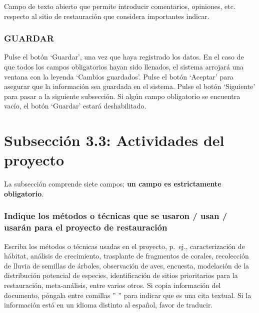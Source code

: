 \documentclass[
]{book}
\begin{document}
Campo de texto abierto que permite introducir comentarios, opiniones, etc. respecto al sitio de restauración que considera importantes indicar.

\hypertarget{guardar-4}{%
\subsection{GUARDAR}\label{guardar-4}}

Pulse el botón `Guardar', una vez que haya registrado los datos.
En el caso de que todos los campos obligatorios hayan sido llenados, el sistema arrojará una ventana con la leyenda `Cambios guardados'. Pulse el botón `Aceptar' para asegurar que la información sea guardada en el sistema.
Pulse el botón `Siguiente' para pasar a la siguiente subsección.
Si algún campo obligatorio se encuentra vacío, el botón `Guardar' estará deshabilitado.

\hypertarget{subsecciuxf3n-3.3-actividades-del-proyecto}{%
\chapter*{Subsección 3.3: Actividades del proyecto}\label{subsecciuxf3n-3.3-actividades-del-proyecto}}

La subsección comprende siete campos; \textbf{un campo es estrictamente obligatorio}.

\hypertarget{indique-los-muxe9todos-o-tuxe9cnicas-que-se-usaron-usan-usaruxe1n-para-el-proyecto-de-restauraciuxf3n}{%
\subsection{Indique los métodos o técnicas que se usaron / usan / usarán para el proyecto de restauración}\label{indique-los-muxe9todos-o-tuxe9cnicas-que-se-usaron-usan-usaruxe1n-para-el-proyecto-de-restauraciuxf3n}}

Escriba los métodos o técnicas usadas en el proyecto, p.~ej., caracterización de hábitat, análisis de crecimiento, trasplante de fragmentos de corales, recolección de lluvia de semillas de árboles, observación de aves, encuesta, modelación de la distribución potencial de especies, identificación de sitios prioritarios para la restauración, meta-análisis, entre varios otros. Si copia información del documento, póngala entre comillas '' '' para indicar que es una cita textual. Si la información está en un idioma distinto al español, favor de traducir.
\end{document}
